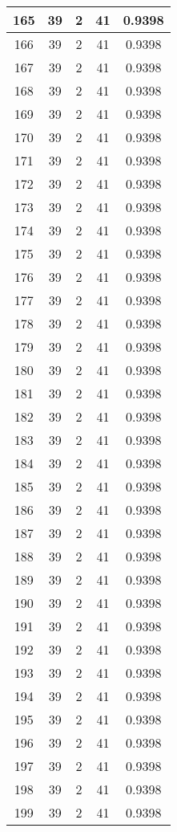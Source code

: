 \documentclass[letterpaper, 12pt]{article}
\begin{document}
\begin{longtable}{|c|c|c|c|c|}
\hline
165 & 39 & 2 & 41 & 0.9398 \\
\hline
166 & 39 & 2 & 41 & 0.9398 \\
\hline
167 & 39 & 2 & 41 & 0.9398 \\
\hline
168 & 39 & 2 & 41 & 0.9398 \\
\hline
169 & 39 & 2 & 41 & 0.9398 \\
\hline
170 & 39 & 2 & 41 & 0.9398 \\
\hline
171 & 39 & 2 & 41 & 0.9398 \\
\hline
172 & 39 & 2 & 41 & 0.9398 \\
\hline
173 & 39 & 2 & 41 & 0.9398 \\
\hline
174 & 39 & 2 & 41 & 0.9398 \\
\hline
175 & 39 & 2 & 41 & 0.9398 \\
\hline
176 & 39 & 2 & 41 & 0.9398 \\
\hline
177 & 39 & 2 & 41 & 0.9398 \\
\hline
178 & 39 & 2 & 41 & 0.9398 \\
\hline
179 & 39 & 2 & 41 & 0.9398 \\
\hline
180 & 39 & 2 & 41 & 0.9398 \\
\hline
181 & 39 & 2 & 41 & 0.9398 \\
\hline
182 & 39 & 2 & 41 & 0.9398 \\
\hline
183 & 39 & 2 & 41 & 0.9398 \\
\hline
184 & 39 & 2 & 41 & 0.9398 \\
\hline
185 & 39 & 2 & 41 & 0.9398 \\
\hline
186 & 39 & 2 & 41 & 0.9398 \\
\hline
187 & 39 & 2 & 41 & 0.9398 \\
\hline
188 & 39 & 2 & 41 & 0.9398 \\
\hline
189 & 39 & 2 & 41 & 0.9398 \\
\hline
190 & 39 & 2 & 41 & 0.9398 \\
\hline
191 & 39 & 2 & 41 & 0.9398 \\
\hline
192 & 39 & 2 & 41 & 0.9398 \\
\hline
193 & 39 & 2 & 41 & 0.9398 \\
\hline
194 & 39 & 2 & 41 & 0.9398 \\
\hline
195 & 39 & 2 & 41 & 0.9398 \\
\hline
196 & 39 & 2 & 41 & 0.9398 \\
\hline
197 & 39 & 2 & 41 & 0.9398 \\
\hline
198 & 39 & 2 & 41 & 0.9398 \\
\hline
199 & 39 & 2 & 41 & 0.9398 \\
\hline
\end{longtable}
\end{document}
